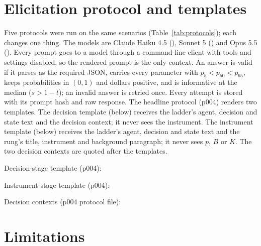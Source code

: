 \documentclass{article}
\begin{document}
\FloatBarrier
\section{Elicitation protocol and templates}
\label{app:protocol}

Five protocols were run on the same \voiNScenarios{} scenarios (Table~\ref{tab:protocols}); each changes one thing. The models are Claude Haiku 4.5 (\twModelHaiku), Sonnet 5 (\twModelSonnet) and Opus 5.5 (\twModelOpus). Every prompt goes to a model through a command-line client with tools and settings disabled, so the rendered prompt is the only context. An answer is valid if it parses as the required JSON, carries every parameter with $p_5<p_{50}<p_{95}$, keeps probabilities in $(0,1)$ and dollars positive, and is informative at the median ($s>1-t$); an invalid answer is retried once. Every attempt is stored with its prompt hash and raw response. The headline protocol (p004) renders two templates. The decision template (below) receives the ladder's agent, decision and state text and the decision context; it never sees the instrument. The instrument template (below) receives the ladder's agent, decision and state text and the rung's title, instrument and background paragraph; it never sees $p$, $B$ or $K$. The two decision contexts are quoted after the templates.

\begin{nolinenumbers}
\noindent Decision-stage template (p004):


\noindent Instrument-stage template (p004):


\noindent Decision contexts (p004 protocol file):

\end{nolinenumbers}

\FloatBarrier
\section{Limitations}
\label{app:limits}
\end{document}

